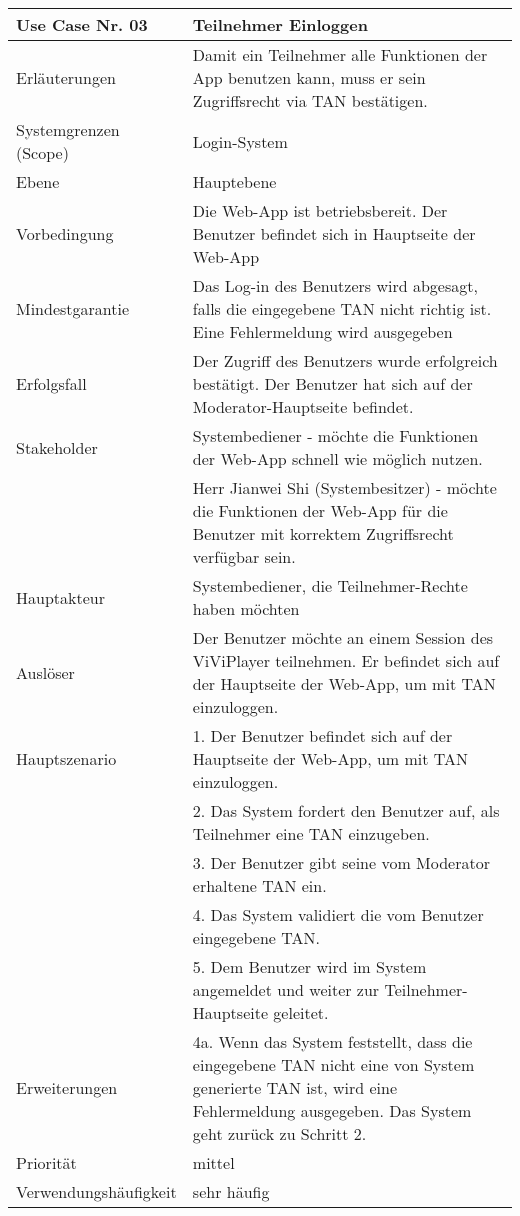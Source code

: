 \begin{tabularx}{\linewidth}{|l|X|}
	\hline
	Use Case Nr. 03			& \textbf{Teilnehmer Einloggen} \\ \hline
	Erläuterungen			& Damit ein Teilnehmer alle Funktionen der App benutzen kann, 
							  muss er sein Zugriffsrecht via TAN bestätigen. \\ \hline
	Systemgrenzen (Scope)	& Login-System \\ \hline
	Ebene					& Hauptebene \\ \hline
	Vorbedingung			& Die Web-App ist betriebsbereit. Der Benutzer befindet sich in
							  Hauptseite der Web-App \\ \hline
	Mindestgarantie			& Das Log-in des Benutzers wird abgesagt, falls die eingegebene
							  TAN nicht richtig ist. Eine Fehlermeldung wird ausgegeben
							  \\ \hline
	Erfolgsfall 			& Der Zugriff des Benutzers wurde erfolgreich bestätigt. Der
							  Benutzer hat sich auf der Moderator-Hauptseite befindet. \\ \hline
	Stakeholder				& Systembediener - möchte die Funktionen der Web-App schnell 
							  wie möglich nutzen. \\
							& Herr Jianwei Shi (Systembesitzer) - möchte die Funktionen der 
							  Web-App für die Benutzer mit korrektem Zugriffsrecht verfügbar sein.\\ \hline
	Hauptakteur				& Systembediener, die Teilnehmer-Rechte haben möchten \\ \hline
	Auslöser				& Der Benutzer möchte an einem Session des ViViPlayer
							  teilnehmen. Er befindet sich auf der Hauptseite der Web-App,
							  um mit TAN einzuloggen. \\ \hline	
	Hauptszenario			& 1. Der Benutzer befindet sich auf der Hauptseite der Web-App,
	                          um mit TAN einzuloggen. \\
	                        & 2. Das System fordert den Benutzer auf, als Teilnehmer eine
							  TAN einzugeben. \\
							& 3. Der Benutzer gibt seine vom Moderator erhaltene TAN ein. \\
							& 4. Das System validiert die vom Benutzer eingegebene
							  TAN. \\
							& 5. Dem Benutzer wird im System angemeldet und weiter zur
							  Teilnehmer-Hauptseite geleitet. \\ \hline
	Erweiterungen			& 4a. Wenn das System feststellt, dass die eingegebene TAN nicht 
							  eine von System generierte TAN ist, wird eine Fehlermeldung 
							  ausgegeben. Das System geht zurück zu Schritt 2. \\ \hline
	Priorität				& mittel \\ \hline
	Verwendungshäufigkeit	& sehr häufig \\ \hline
\end{tabularx}
